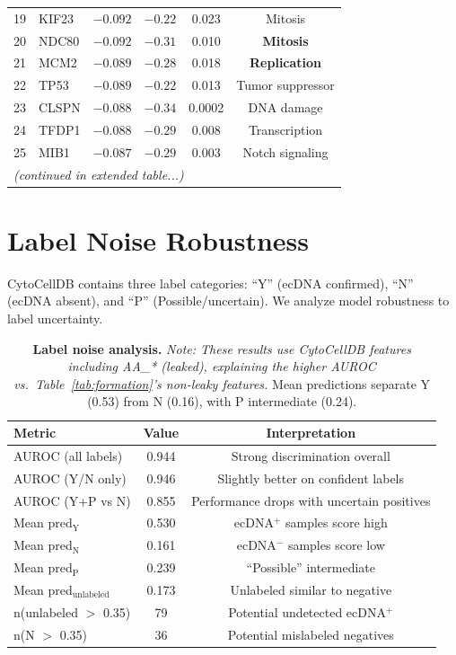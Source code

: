 \documentclass{article}
\begin{document}
\begin{table}[h]
\begin{tabular}{@{}rlcccc@{}}
19 & KIF23 & $-0.092$ & $-0.22$ & 0.023 & Mitosis \\
20 & NDC80 & $-0.092$ & $-0.31$ & 0.010 & \textbf{Mitosis} \\
21 & MCM2 & $-0.089$ & $-0.28$ & 0.018 & \textbf{Replication} \\
22 & TP53 & $-0.089$ & $-0.22$ & 0.013 & Tumor suppressor \\
23 & CLSPN & $-0.088$ & $-0.34$ & 0.0002 & DNA damage \\
24 & TFDP1 & $-0.088$ & $-0.29$ & 0.008 & Transcription \\
25 & MIB1 & $-0.087$ & $-0.29$ & 0.003 & Notch signaling \\
\midrule
\multicolumn{6}{l}{\textit{(continued in extended table...)}} \\
\bottomrule
\end{tabular}
\end{table}


\section{Label Noise Robustness}
\label{app:noise}

CytoCellDB contains three label categories: ``Y'' (ecDNA confirmed), ``N'' (ecDNA absent), and ``P'' (Possible/uncertain). We analyze model robustness to label uncertainty.

\begin{table}[h]
\caption{\textbf{Label noise analysis.} \textit{Note: These results use CytoCellDB features including AA\_* (leaked), explaining the higher AUROC vs.\ Table~\ref{tab:formation}'s non-leaky features.} Mean predictions separate Y (0.53) from N (0.16), with P intermediate (0.24).}
\label{tab:noise}
\centering
\small
\begin{tabular}{@{}lcc@{}}
\toprule
Metric & Value & Interpretation \\
\midrule
AUROC (all labels) & 0.944 & Strong discrimination overall \\
AUROC (Y/N only) & 0.946 & Slightly better on confident labels \\
AUROC (Y+P vs N) & 0.855 & Performance drops with uncertain positives \\
\midrule
Mean pred$_{\text{Y}}$ & 0.530 & ecDNA$^+$ samples score high \\
Mean pred$_{\text{N}}$ & 0.161 & ecDNA$^-$ samples score low \\
Mean pred$_{\text{P}}$ & 0.239 & ``Possible'' intermediate \\
Mean pred$_{\text{unlabeled}}$ & 0.173 & Unlabeled similar to negative \\
\midrule
n(unlabeled $>$ 0.35) & 79 & Potential undetected ecDNA$^+$ \\
n(N $>$ 0.35) & 36 & Potential mislabeled negatives \\
\bottomrule
\end{tabular}
\end{table}
\end{document}
